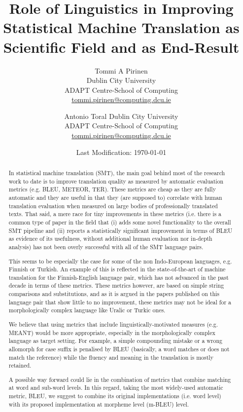 \documentclass[a4paper]{article}
\title{Role of Linguistics in Improving Statistical Machine Translation as
Scientific Field and as End-Result}
\author{Tommi A Pirinen\\
Dublin City University\\
ADAPT Centre-School of Computing\\
\url{tommi.pirinen@computing.dcu.ie}
\and
Antonio Toral
Dublin City University\\
ADAPT Centre-School of Computing\\
\url{tommi.pirinen@computing.dcu.ie}
}
\date{Last Modification: \today}
\begin{document}
\maketitle

\begin{abstract} 
    In statistical machine translation (SMT), the main goal behind
    most of the research work to date is to improve translation quality as
    measured by automatic evaluation metrics (e.g. BLEU, METEOR, TER). These
    metrics are cheap as they are fully automatic and they are useful in that
    they (are supposed to) correlate with human translation evaluation when
    measured on large bodies of professionally translated texts. That said, a
    mere race for tiny improvements in these metrics (i.e. there is a common
    type of paper in the field  that (i) adds some novel functionality to the
    overall SMT pipeline and (ii) reports a statistically significant
    improvement in terms of BLEU as evidence of its usefulness, without
    additional human evaluation nor in-depth analysis) has not been overly
    successful with all of the SMT language pairs.

    This seems to be especially the case for some of the non Indo-European
    languages, e.g. Finnish or Turkish.  An example of this is reflected in the
    state-of-the-art of machine translation for the Finnish-English language
    pair, which has not advanced in the past decade in terms of these metrics.
    These metrics however, are based on simple string comparisons and
    substitutions, and as it is argued in the papers published on this language
    pair that show little to no
    improvement\cite{clifton2011combining,luong2010hybrid,virpioja2007morphology},
    these metrics may not be ideal for a morphologically complex language like
    Uralic or Turkic ones.

    We believe that using metrics that include linguistically-motivated
    measures (e.g. MEANT\cite{lo2011meant}) would be more appropriate,
    especially in the morphologically complex language as target setting.  For
    example, a simple compounding mistake or a wrong allomorph for case suffix
    is penalised by BLEU (basically, a word matches or does not match the
    reference) while the fluency and meaning in the translation is mostly
    retained.

    A possible way forward could lie in the combination of metrics that combine
    matching at word and sub-word levels. In this regard, taking the most
    widely-used automatic metric, BLEU, we suggest to combine its original
    implementations (i.e. word level) with its proposed implementation at
    morpheme level (m-BLEU\cite{luong2010hybrid}) level.


\end{abstract}
\end{document}
